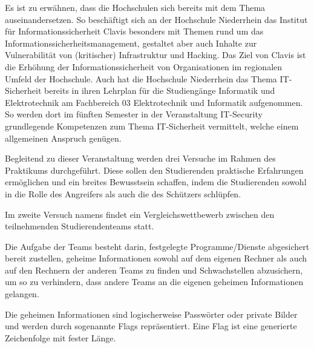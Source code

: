 Es ist zu erwähnen, dass die Hochschulen sich bereits mit dem Thema auseinandersetzen. 
So beschäftigt sich an der Hochschule Niederrhein das Institut für Informationssicherheit Clavis besonders mit Themen rund um das Informationssicherheitsmanagement, gestaltet aber auch Inhalte zur Vulnerabilität von (kritischer) Infrastruktur und Hacking.
Das Ziel von Clavis ist die Erhöhung der Informationssicherheit von Organisationen im regionalen Umfeld der Hochschule.
\cite{hochschuleniederrheinFlyerInstitutClavis}
Auch hat die Hochschule Niederrhein das Thema IT-Sicherheit bereits in ihren Lehrplan für die Studiengänge Informatik und Elektrotechnik am Fachbereich 03 Elektrotechnik und Informatik aufgenommen. So werden dort im fünften Semester in der Veranstaltung IT-Security grundlegende Kompetenzen zum Thema IT-Sicherheit vermittelt, welche einem allgemeinen Anspruch genügen. \cite{hochschuleniederrheinModulhandbuchVollzeitBA2019}

Begleitend zu dieser Veranstaltung werden drei Versuche im Rahmen des Praktikums durchgeführt. Diese sollen den Studierenden praktische Erfahrungen ermöglichen und ein breites Bewusstsein schaffen, indem die Studierenden sowohl in die Rolle des Angreifers als auch die des Schützers schlüpfen.

Im zweite Versuch namens  findet ein Vergleichswettbewerb zwischen den teilnehmenden Studierendenteams statt.

Die Aufgabe der Teams besteht darin, festgelegte Programme/Dienste abgesichert bereit zustellen, geheime Informationen sowohl auf dem eigenen Rechner als auch auf den Rechnern der anderen Teams zu finden und Schwachstellen abzusichern, um so zu verhindern, dass andere Teams an die eigenen geheimen Informationen gelangen. \cite[S. 2]{sosnaKonzeptionUndRealisierung2010} 

Die geheimen Informationen sind logischerweise Passwörter oder private Bilder und werden durch sogenannte Flags repräsentiert. Eine Flag ist eine generierte Zeichenfolge mit fester Länge.